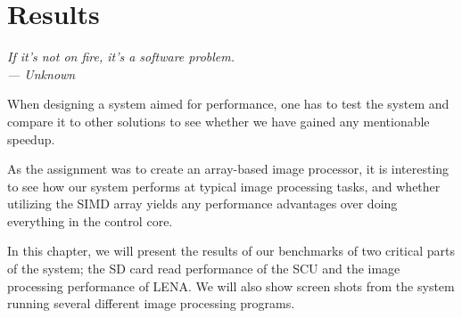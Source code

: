\chapter{Results}\label{ch:res}

\begin{flushright}{\slshape
    If it's not on fire, it's a software problem.\\ \medskip
    --- Unknown}
\end{flushright}

When designing a system aimed for performance, one has to test the system and
compare it to other solutions to see whether we have gained any mentionable
speedup.

As the assignment was to create an array-based
image processor, it is interesting to see how our system performs
at typical image processing tasks, and whether utilizing the \ac{SIMD}
array yields any performance advantages over doing everything in the
control core.


In this chapter, we will present the results of our benchmarks of two
critical parts of the system; the SD card read performance of the
\ac{SCU} and the image processing performance of LENA. We will also show
screen shots from the system running several different image processing
programs.





